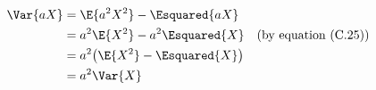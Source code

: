 \setlength{\abovedisplayskip}{-\baselineskip}
\begin{align*}
    \Var{aX} &= \E{a^2X^2}-\Esquared{aX} \\
    &= a^2\E{X^2}-a^2\Esquared{X} && \text{(by equation (C.25))} \\
    &= a^2\!\left(\E{X^2}-\Esquared{X}\right) \\
    &= a^2\Var{X}
\end{align*}
